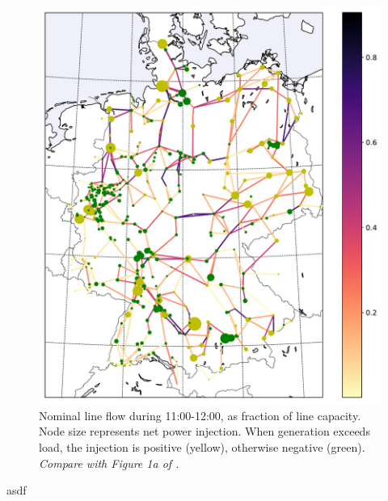\documentclass[main.tex]{subfiles}
\begin{document}
\begin{figure}
    \centering
    \includegraphics[width=.6\textwidth]{img/nominallineflow.pdf}
    \caption{Nominal line flow during 11:00-12:00, as fraction of line capacity. Node size represents net power injection. When generation exceeds load, the injection is positive (yellow), otherwise negative (green). \emph{Compare with Figure 1a of \cite{Nesti2018emergentfailures}.}}
    \label{fig:generationtech}
\end{figure}
asdf

\end{document}
